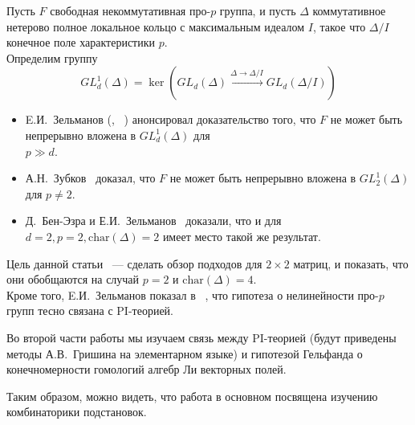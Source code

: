 \noindent
Пусть $F$ свободная некоммутативная про-$p$ группа, и пусть $\Delta$ коммутативное нетерово полное локальное кольцо с максимальным идеалом $I$, такое что
$\Delta/I$ конечное поле характеристики $p$.\\
Определим группу
\[GL_d^1(\Delta) = \ker\left( GL_d(\Delta) \xrightarrow{\Delta\to\Delta/I} GL_d(\Delta/I) \right)\]
\begin{itemize}
    \item E.И.\ Зельманов (\cite{Zelmanov1}, ~\cite{Zelmanov2}) анонсировал доказательство того, что $F$ не может быть непрерывно вложена в $GL_d^1(\Delta)$ для\\$p\gg d$.
    \item А.Н.\ Зубков~\cite{Zubkov} доказал, что $F$ не может быть непрерывно вложена в $GL_2^1(\Delta)$ для $p\neq2$.
    \item Д.\ Бен-Эзра и Е.И.\ Зельманов~\cite{Ben-Ezra-Zelmanov} доказали, что и для\\$d=2, p=2, \mathrm{char}(\Delta)=2$ имеет место такой же результат.
\end{itemize}

Цель данной статьи ~--- сделать обзор подходов для $2\times2$ матриц, и показать, что они обобщаются на случай $p=2$ и $\mathrm{char}(\Delta)=4$.\\
Кроме того, E.И.\ Зельманов показал в ~\cite{Zelmanov1}, что гипотеза о нелинейности про-$p$ групп тесно связана с PI-теорией.

Во второй части работы мы изучаем связь между PI-теорией (будут приведены методы А.В.\ Гришина на элементарном языке)
и гипотезой Гельфанда о конечномерности гомологий алгебр Ли векторных полей.

Таким образом, можно видеть, что работа в основном посвящена изучению комбинаторики подстановок.